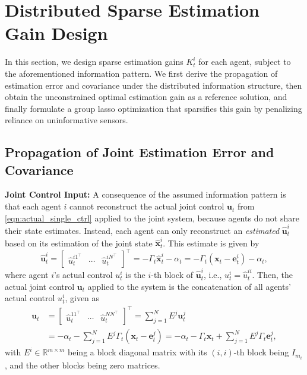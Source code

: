 \documentclass[letterpaper, 10 pt, conference]{ieeeconf}  %
\begin{document}
\section{Distributed Sparse Estimation Gain Design}
\label{sec:obs_model_selection}

In this section, we design sparse estimation gains $K_t^i$ for each agent, subject to the aforementioned information pattern. We first derive the propagation of estimation error and covariance under the distributed information structure, then obtain the unconstrained optimal estimation gain as a reference solution, and finally formulate a group lasso optimization that sparsifies this gain by penalizing reliance on uninformative sensors.

\subsection{Propagation of Joint Estimation Error and Covariance}
\label{sec:err_cov_propgation}
\textbf{Joint Control Input:} A consequence of the assumed information pattern is that each agent $i$ cannot reconstruct the actual joint control $\textbf{u}_t$ from \eqref{eqn:actual_single_ctrl} applied to the joint system, because agents do not share their state estimates. Instead, each agent can only reconstruct an \textit{estimated} $\hat{\textbf{u}}_t^i$ based on its estimation of the joint state $\hat{\textbf{x}}_t^i$. This estimate is given by
\begin{equation}
    \hat{\textbf{u}}_t^i=\begin{bmatrix}
            \hat{u}_t^{i1^\top}&\cdots&\hat{u}_t^{iN^\top}
        \end{bmatrix}^\top=-\Gamma_t\hat{\textbf{x}}_t^i-\alpha_t=-\Gamma_t(\textbf{x}_t-\textbf{e}_t^i)-\alpha_t,
    \label{eqn:estimated_control}%
\end{equation}
where agent $i$'s actual control $u_t^i$  is the $i$-th block of $\hat{\textbf{u}}_t^i$, i.e., $u_t^i=\hat{u}_t^{ii}$. Then, the actual joint control $\textbf{u}_t$ applied to the system is the concatenation of all agents' actual control $u_t^i$, given as
\begin{equation}
    \begin{aligned}
        \textbf{u}_t&=\begin{bmatrix}
            \hat{u}_t^{11^\top}&\cdots&\hat{u}_t^{NN^\top}
        \end{bmatrix}^\top=\sum_{j=1}^NE^j\textbf{u}_t^j\\
        &=-\alpha_t-\sum_{j=1}^NE^j\Gamma_t(\textbf{x}_t-\textbf{e}_t^j)=-\alpha_t-\Gamma_t\textbf{x}_t+\sum_{j=1}^NE^j\Gamma_t\textbf{e}_t^j,
    \end{aligned}
    \label{eqn:actual_control}
\end{equation}
with $E^i\in\mathbb{R}^{m\times m}$ being a block diagonal matrix with its $(i,i)$-th block being $I_{m_i}$, and the other blocks being zero matrices. 
\end{document}
